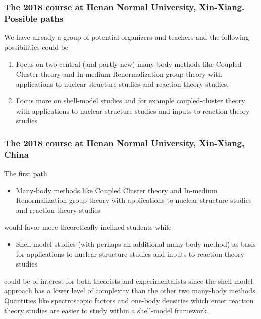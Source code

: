 \documentclass{beamer}
\begin{document}
\begin{frame}
\frametitle{The 2018 course at \href{{http://www.htu.cn/english/}}{Henan Normal University, Xin-Xiang}. Possible paths}

\begin{block}{}
We have already a group of potential organizers and teachers and the following possibilities could be
\begin{enumerate}
\item Focus on two central (and partly new) many-body methods like Coupled Cluster theory and In-medium Renormalization group theory with applications to nuclear structure studies and reaction theory studies.

\item Focus more on shell-model studies and for example coupled-cluster theory with applications to nuclear structure studies and inputs to reaction theory studies
\end{enumerate}

\noindent
\end{block}
\end{frame}

\begin{frame}
\frametitle{The 2018 course at \href{{http://www.htu.cn/english/}}{Henan Normal University, Xin-Xiang}, China}

\begin{block}{}
The first path
\begin{itemize}
\item Many-body methods like Coupled Cluster theory and In-medium Renormalization group theory with applications to nuclear structure studies and reaction theory studies
\end{itemize}

\noindent
would favor more theoretically inclined students while
\begin{itemize}
\item Shell-model studies (with perhaps an additional many-body method) as basis for applications to nuclear structure studies and inputs to reaction theory studies
\end{itemize}

\noindent
could be of interest for both theorists and experimentalists since the shell-model approach has a lower level of complexity than the other two many-body methods.
Quantities like spectroscopic factors and one-body densities which enter reaction theory studies are easier to study within a shell-model framework.


\end{block}
\end{frame}
\end{document}
